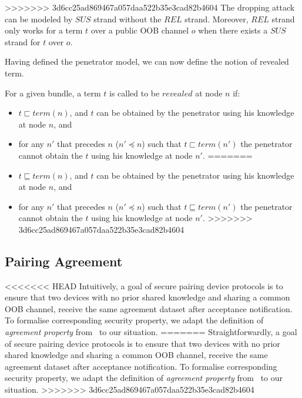 \begin{itemize}
>>>>>>> 3d6cc25ad869467a057daa522b35e3cad82b4604
The dropping attack can be modeled by $SUS$ strand without the $REL$ strand. Moreover, $REL$ strand only works for a term $t$ over a public OOB channel $o$ when there exists a $SUS$ strand for $t$ over $o$.  

Having defined the penetrator model, we can now define the notion of revealed term.

\begin{Definition}
For a given bundle, a term $t$ is called to be $revealed$ at node $n$ if:
\begin{itemize}
<<<<<<< HEAD
    \item $t \sqsubset term(n)$, and $t$ can be obtained by the penetrator using his knowledge at node $n$, and
    \item for any $n'$ that precedes $n$ ($n' \preceq n$) such that $t \sqsubset term(n')$ the penetrator cannot obtain the $t$ using his knowledge at node $n'$. 
=======
    \item $t \sqsubseteq term(n)$, and $t$ can be obtained by the penetrator using his knowledge at node $n$, and
    \item for any $n'$ that precedes $n$ ($n' \preceq n$) such that $t \sqsubseteq term(n')$ the penetrator cannot obtain the $t$ using his knowledge at node $n'$. 
>>>>>>> 3d6cc25ad869467a057daa522b35e3cad82b4604
\end{itemize} 
\end{Definition}

\subsection{Pairing Agreement}

<<<<<<< HEAD
Intuitively, a goal of secure pairing device protocols is to ensure that two devices with no prior shared knowledge and sharing a common OOB channel, receive the same agreement dataset after acceptance notification. To formalise corresponding security property, we adapt the definition of \textit{agreement property} from~\cite{596782} to our situation.
=======
Straightforwardly, a goal of secure pairing device protocols is to ensure that two devices with no prior shared knowledge and sharing a common OOB channel, receive the same agreement dataset after acceptance notification. To formalise corresponding security property, we adapt the definition of \textit{agreement property} from~\cite{596782} to our situation.
>>>>>>> 3d6cc25ad869467a057daa522b35e3cad82b4604


\end{itemize}
